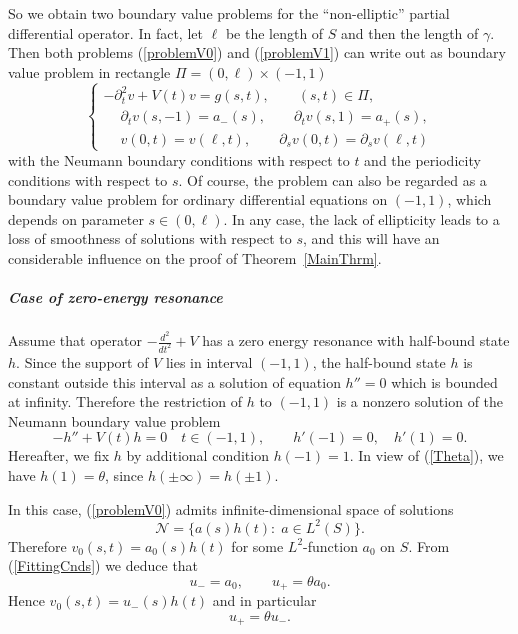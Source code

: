 \documentclass[graybox]{svmult}
\newcommand{\eqref}[1]{(\ref{#1})}
\newcommand{\pte}{\partial_t}
\begin{document}
So we obtain two boundary value problems for the ``non-ellip\-tic'' partial differential operator.
In fact, let $\ell$ be the length of $S$ and then the length of $\gamma$. Then both problems \eqref{problemV0} and  \eqref{problemV1} can write out as  boundary value problem in  rectangle $\Pi=(0,\ell)\times(-1,1)$
$$
\left\{
  \begin{array}{ll}
    -\pte^2 v+V(t)v=g(s,t), \qquad (s,t)\in \Pi, \\
    \phantom{-}\partial_t v(s,- 1)=a_-(s), \qquad \partial_t v(s, 1)=a_+(s),\\
\phantom{-}v(0,t)=v(\ell,t), \qquad \partial_s v(0,t)=\partial_s v(\ell,t)
  \end{array}
\right.
$$
with the Neumann boundary conditions with respect to $t$ and the periodicity conditions with respect to $s$.
Of course,  the problem can also be  regarded as a boundary value problem for ordinary differential equations on $(-1,1)$, which depends on parameter $s\in (0,\ell)$. In any case, the lack of ellipticity  leads to a loss of smoothness of solutions with respect to $s$, and this will have an considerable influence on the proof of Theorem~\ref{MainThrm}.







\subparagraph{Case of zero-energy resonance}
Assume that operator $-\frac{d^2}{dt^2}+V$ has a zero energy resonance with half-bound state $h$. Since the support of $V$ lies in  interval $(-1,1)$, the half-bound state $h$ is  constant  outside this interval as a solution of equation $h''=0$ which is bounded at infinity.
Therefore the restriction of $h$ to $(-1,1)$ is a nonzero solution of the Neumann boundary value problem
\begin{equation}\label{NeumanProblem}
     -h''+V(t)h= 0\quad t\in(-1,1),\qquad   h'(-1)=0, \quad h'(1)=0.
\end{equation}
Hereafter, we fix $h$ by additional condition $h(-1)=1$. In view of
\eqref{Theta}, we have $h(1)=\theta$, since $h(\pm\infty)=h(\pm 1)$.




In this case, \eqref{problemV0}  admits infinite-dimensional space of solutions
$$
\mathcal{N}=\big\{a(s)h(t)\colon \;a\in L^2(S)\big\}.
$$
Therefore $v_0(s,t)=a_0(s)h(t)$ for some $L^2$-function $a_0$ on $S$. From \eqref{FittingCnds} we deduce that
$$
   u_-=a_0, \qquad u_+=\theta a_0.
$$
Hence $v_0(s,t)=u_-(s)h(t)$ and  in particular
\begin{equation}\label{RCond0}
     u_+=\theta u_-.
\end{equation}
\end{document}

